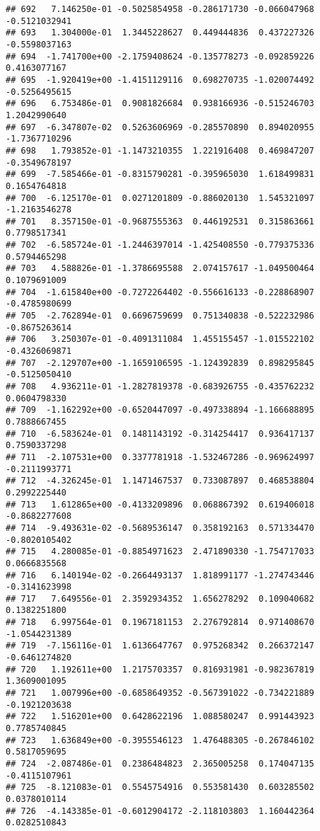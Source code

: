\documentclass[
]{article}
\begin{document}
\begin{verbatim}
## 692   7.146250e-01 -0.5025854958 -0.286171730 -0.066047968 -0.5121032941
## 693   1.304000e-01  1.3445228627  0.449444836  0.437227326 -0.5598037163
## 694  -1.741700e+00 -2.1759408624 -0.135778273 -0.092859226  0.4163077167
## 695  -1.920419e+00 -1.4151129116  0.698270735 -1.020074492 -0.5256495615
## 696   6.753486e-01  0.9081826684  0.938166936 -0.515246703  1.2042990640
## 697  -6.347807e-02  0.5263606969 -0.285570890  0.894020955 -1.7367710296
## 698   1.793852e-01 -1.1473210355  1.221916408  0.469847207 -0.3549678197
## 699  -7.585466e-01 -0.8315790281 -0.395965030  1.618499831  0.1654764818
## 700  -6.125170e-01  0.0271201809 -0.886020130  1.545321097 -1.2163546278
## 701   8.357150e-01 -0.9687555363  0.446192531  0.315863661  0.7798517341
## 702  -6.585724e-01 -1.2446397014 -1.425408550 -0.779375336  0.5794465298
## 703   4.588826e-01 -1.3786695588  2.074157617 -1.049500464  0.1079691009
## 704  -1.615840e+00 -0.7272264402 -0.556616133 -0.228868907 -0.4785980699
## 705  -2.762894e-01  0.6696759699  0.751340838 -0.522232986 -0.8675263614
## 706   3.250307e-01 -0.4091311084  1.455155457 -1.015522102 -0.4326069871
## 707  -2.129707e+00 -1.1659106595 -1.124392839  0.898295845 -0.5125050410
## 708   4.936211e-01 -1.2827819378 -0.683926755 -0.435762232  0.0604798330
## 709  -1.162292e+00 -0.6520447097 -0.497338894 -1.166688895  0.7888667455
## 710  -6.583624e-01  0.1481143192 -0.314254417  0.936417137  0.7590337298
## 711  -2.107531e+00  0.3377781918 -1.532467286 -0.969624997 -0.2111993771
## 712  -4.326245e-01  1.1471467537  0.733087897  0.468538804  0.2992225440
## 713   1.612865e+00 -0.4133209896  0.068867392  0.619406018 -0.8682277608
## 714  -9.493631e-02 -0.5689536147  0.358192163  0.571334470 -0.8020105402
## 715   4.280085e-01 -0.8854971623  2.471890330 -1.754717033  0.0666835568
## 716   6.140194e-02 -0.2664493137  1.818991177 -1.274743446 -0.3141623998
## 717   7.649556e-01  2.3592934352  1.656278292  0.109040682  0.1382251800
## 718   6.997564e-01  0.1967181153  2.276792814  0.971408670 -1.0544231389
## 719  -7.156116e-01  1.6136647767  0.975268342  0.266372147 -0.6461274820
## 720   1.192611e+00  1.2175703357  0.816931981 -0.982367819  1.3609001095
## 721   1.007996e+00 -0.6858649352 -0.567391022 -0.734221889 -0.1921203638
## 722   1.516201e+00  0.6428622196  1.088580247  0.991443923  0.7785740845
## 723   1.636849e+00 -0.3955546123  1.476488305 -0.267846102  0.5817059695
## 724  -2.087486e-01  0.2386484823  2.365005258  0.174047135 -0.4115107961
## 725  -8.121083e-01  0.5545754916  0.553581430  0.603285502  0.0378010114
## 726  -4.143385e-01 -0.6012904172 -2.118103803  1.160442364  0.0282510843

\end{verbatim}
\end{document}
